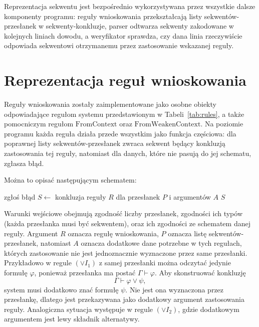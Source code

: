 \documentclass[shortabstract]{iithesis}
\theoremstyle{definition}
\theoremstyle{remark}
\theoremstyle{plain}
\begin{document}
Reprezentacja sekwentu jest bezpośrednio wykorzystywana przez wszystkie dalsze
komponenty programu: reguły wnioskowania przekształcają listy sekwentów-przesłanek
w sekwenty-konkluzje, parser odtwarza sekwenty zakodowane w kolejnych liniach
dowodu, a weryfikator sprawdza, czy dana linia rzeczywiście odpowiada sekwentowi
otrzymanemu przez zastosowanie wskazanej reguły.
\section{Reprezentacja reguł wnioskowania}

Reguły wnioskowania zostały zaimplementowane jako osobne obiekty odpowiadające
regułom systemu przedstawionym w Tabeli~\ref{tab:rules}, a także pomocniczym
regułom \(\mathrm{FromContext}\) oraz \(\mathrm{FromWeakenContext}\). Na poziomie
programu każda reguła działa przede wszystkim jako funkcja częściowa: dla poprawnej
listy sekwentów-przesłanek zwraca sekwent będący konkluzją zastosowania tej reguły,
natomiast dla danych, które nie pasują do jej schematu, zgłasza błąd.

Można to opisać następującym schematem:


\begin{algorithm}[H]
\caption{Zastosowanie reguły wnioskowania}
\begin{algorithmic}[1]
        \State zgłoś błąd
    \EndIf
    \State $S \gets$ konkluzja reguły $R$ dla przesłanek $P$ i argumentów $A$
    \State \Return $S$
\EndProcedure
\end{algorithmic}
\end{algorithm}

Warunki wejściowe obejmują zgodność liczby przesłanek, zgodności ich typów (każda przesłanka musi być sekwentem), oraz ich zgodności ze schematem danej reguły. 
Argument \(R\) oznacza regułę wnioskowania, \(P\) oznacza
listę sekwentów-przesłanek, natomiast \(A\)
oznacza dodatkowe dane potrzebne w tych regułach, których zastosowanie nie jest
jednoznacznie wyznaczone przez same przesłanki. Przykładowo w regule \((\vee I_1)\) z samej przesłanki można odczytać jedynie
formułę \(\varphi\), ponieważ przesłanka ma postać \(\Gamma \vdash \varphi\).
Aby skonstruować konkluzję
\[
    \Gamma \vdash \varphi \vee \psi,
\]
system musi dodatkowo znać formułę \(\psi\). Nie jest ona wyznaczona przez
przesłankę, dlatego jest przekazywana jako dodatkowy argument zastosowania reguły.
Analogiczna sytuacja występuje w regule \((\vee I_2)\), gdzie dodatkowym argumentem
jest lewy składnik alternatywy.
\end{document}
